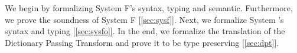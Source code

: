 \noindent We begin by formalizing System F's syntax, typing and semantic. Furthermore, we prove the soundness of System F [\ref{sec:sysf}]. Next, we formalize System \Fo's syntax and typing [\ref{sec:sysfo}]. In the end, we formalize the translation of the Dictionary Passing Transform and prove it to be type preserving [\ref{sec:dpt}].